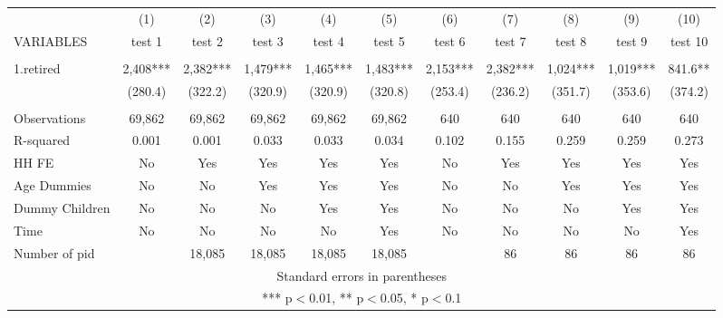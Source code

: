 \begin{tabular}{lcccccccccc} \hline
 & (1) & (2) & (3) & (4) & (5) & (6) & (7) & (8) & (9) & (10) \\
VARIABLES & test 1 & test 2 & test 3 & test 4 & test 5 & test 6 & test 7 & test 8 & test 9 & test 10 \\ \hline
 &  &  &  &  &  &  &  &  &  &  \\
1.retired & 2,408*** & 2,382*** & 1,479*** & 1,465*** & 1,483*** & 2,153*** & 2,382*** & 1,024*** & 1,019*** & 841.6** \\
 & (280.4) & (322.2) & (320.9) & (320.9) & (320.8) & (253.4) & (236.2) & (351.7) & (353.6) & (374.2) \\
 &  &  &  &  &  &  &  &  &  &  \\
Observations & 69,862 & 69,862 & 69,862 & 69,862 & 69,862 & 640 & 640 & 640 & 640 & 640 \\
R-squared & 0.001 & 0.001 & 0.033 & 0.033 & 0.034 & 0.102 & 0.155 & 0.259 & 0.259 & 0.273 \\
HH FE & No & Yes & Yes & Yes & Yes & No & Yes & Yes & Yes & Yes \\
Age Dummies & No & No & Yes & Yes & Yes & No & No & Yes & Yes & Yes \\
Dummy Children & No & No & No & Yes & Yes & No & No & No & Yes & Yes \\
Time & No & No & No & No & Yes & No & No & No & No & Yes \\
 Number of pid &  & 18,085 & 18,085 & 18,085 & 18,085 &  & 86 & 86 & 86 & 86 \\ \hline
\multicolumn{11}{c}{ Standard errors in parentheses} \\
\multicolumn{11}{c}{ *** p$<$0.01, ** p$<$0.05, * p$<$0.1} \\
\end{tabular}
